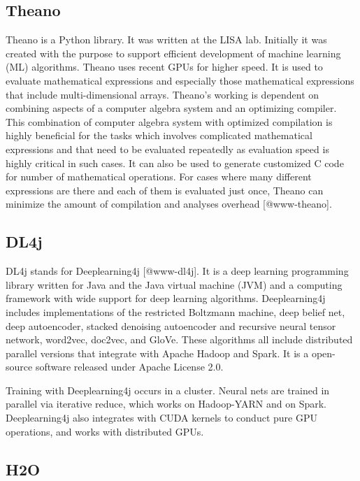     
\subsection{Theano}
    
Theano is a Python library. It was written at the LISA lab.  Initially
it was created with the purpose to support efficient development of
machine learning (ML) algorithms.  Theano uses recent GPUs for higher
speed.  It is used to evaluate mathematical expressions and especially
those mathematical expressions that include multi-dimensional arrays.
Theano's working is dependent on combining aspects of a computer
algebra system and an optimizing compiler.  This combination of
computer algebra system with optimized compilation is highly
beneficial for the tasks which involves complicated mathematical
expressions and that need to be evaluated repeatedly as evaluation
speed is highly critical in such cases.  It can also be used to
generate customized C code for number of mathematical operations.  For
cases where many different expressions are there and each of them is
evaluated just once, Theano can minimize the amount of compilation and
analyses overhead [@www-theano].
    
\subsection{DL4j}

DL4j stands for Deeplearning4j [@www-dl4j]. It is a deep learning
programming library written for Java and the Java virtual machine
(JVM) and a computing framework with wide support for deep learning
algorithms. Deeplearning4j includes implementations of the restricted
Boltzmann machine, deep belief net, deep autoencoder, stacked
denoising autoencoder and recursive neural tensor network, word2vec,
doc2vec, and GloVe. These algorithms all include distributed parallel
versions that integrate with Apache Hadoop and Spark. It is a
open-source software released under Apache License 2.0.

Training with Deeplearning4j occurs in a cluster. Neural nets are
trained in parallel via iterative reduce, which works on Hadoop-YARN
and on Spark. Deeplearning4j also integrates with CUDA kernels to
conduct pure GPU operations, and works with distributed GPUs.
  
\subsection{H2O}

